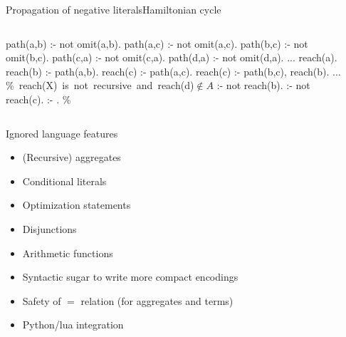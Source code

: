 \begin{frame}{Propagation of negative literals}{Hamiltonian cycle}
  \begin{columns}
    \begin{column}{0.45\textwidth}
    \begin{minipage}{.4\textwidth}\small
      \begin{semiverbatim}
path(a,b) :- not omit(a,b).
path(a,c) :- not omit(a,c).
path(b,c) :- not omit(b,c).
path(c,a) :- not omit(c,a).
path(d,a) :- not omit(d,a).
...
\alert{reach(a)}.
\alert{reach(b)} :- path(a,b).
\alert{reach(c)} :- path(a,c).
\alert{reach(c)} :- path(b,c), reach(b).
...
\mbox{{\color{comment}\% reach(X) is not recursive and reach(d)\({}\not\in{}A\)}}
:- not reach(b).
:- not reach(c).
:- . \color{comment}\% 
      \end{semiverbatim}
    \end{minipage}
    \end{column}
    \begin{column}[t]{0.45\textwidth}
      \centering
      \Graph[draw=none]
    \end{column}
  \end{columns}
\end{frame}
\begin{frame}{Ignored language features}
  \bigskip
  \begin{itemize}
  \item (Recursive) aggregates
  \item Conditional literals
  \item Optimization statements
  \item Disjunctions
  \item Arithmetic functions
  \item Syntactic sugar to write more compact encodings
  \item Safety of \(=\) relation (for aggregates and terms)
  \item Python/lua integration
  \end{itemize}
\end{frame}
%
